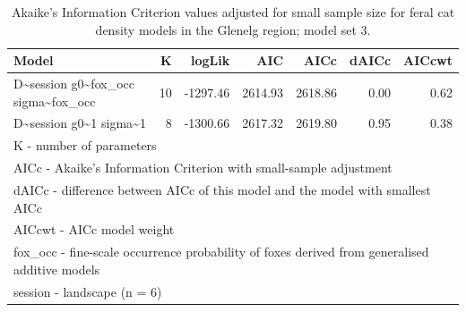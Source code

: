 \documentclass[preprint, 3p, authoryear]{elsarticle} %
\begin{document}
\begin{longtable}[t]{lrrrrrr}
\caption{\label{tab:density-aic-g-4}Akaike's Information Criterion values adjusted for small sample size for feral cat density models in the Glenelg region; model set 3.}\\
\toprule
Model & K & logLik & AIC & AICc & dAICc & AICcwt\\
\midrule
D\textasciitilde{}session g0\textasciitilde{}fox\_occ sigma\textasciitilde{}fox\_occ & 10 & -1297.46 & 2614.93 & 2618.86 & 0.00 & 0.62\\
D\textasciitilde{}session g0\textasciitilde{}1 sigma\textasciitilde{}1 & 8 & -1300.66 & 2617.32 & 2619.80 & 0.95 & 0.38\\
\bottomrule
\multicolumn{7}{l}{\rule{0pt}{1em}K - number of parameters}\\
\multicolumn{7}{l}{\rule{0pt}{1em}AICc - Akaike's Information Criterion with small-sample adjustment}\\
\multicolumn{7}{l}{\rule{0pt}{1em}dAICc - difference between AICc of this model and the model with smallest AICc}\\
\multicolumn{7}{l}{\rule{0pt}{1em}AICcwt - AICc model weight}\\
\multicolumn{7}{l}{\rule{0pt}{1em}fox\_occ - fine-scale occurrence probability of foxes derived from generalised additive models}\\
\multicolumn{7}{l}{\rule{0pt}{1em}session - landscape (n = 6)}\\
\end{longtable}
\endgroup{}

\newpage

\begingroup\fontsize{10}{12}\selectfont
\end{document}

